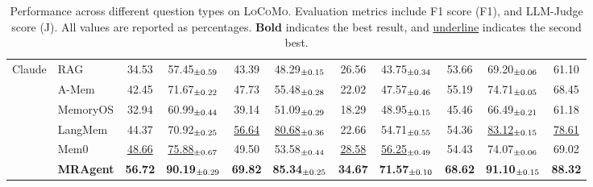 \documentclass{llmxive}
\begin{document}
\begin{table}[t]
\begin{tabular}{ll|cc|cc|cc|cc|c}
\midrule
\multirow{5}{*}{Claude}
& RAG
& 34.53 & 57.45$_{\scriptsize \pm 0.59}$
& 43.39 & 48.29$_{\scriptsize \pm 0.15}$
& 26.56 & 43.75$_{\scriptsize \pm 0.34}$
& 53.66 & 69.20$_{\scriptsize \pm 0.06}$
& 61.10 \\
& A-Mem
& 42.45 & 71.67$_{\scriptsize \pm 0.22}$
& 47.73 & 55.48$_{\scriptsize \pm 0.28}$
& 22.02 & 47.57$_{\scriptsize \pm 0.46}$
& 55.19 & 74.71$_{\scriptsize \pm 0.05}$
& 68.45 \\
& MemoryOS
& 32.94 & 60.99$_{\scriptsize \pm 0.44}$
& 39.14 & 51.09$_{\scriptsize \pm 0.29}$
& 18.29 & 48.95$_{\scriptsize \pm 0.15}$
& 45.46 & 66.49$_{\scriptsize \pm 0.21}$
& 61.18 \\
& LangMem
& 44.37 & 70.92$_{\scriptsize \pm 0.25}$
& \underline{56.64} & \underline{80.68$_{\scriptsize \pm 0.36}$}
& 22.66 & 54.71$_{\scriptsize \pm 0.55}$
& 54.36 & \underline{83.12$_{\scriptsize \pm 0.15}$}
& \underline{78.61} \\
& Mem0
& \underline{48.66} & \underline{75.88$_{\scriptsize \pm 0.67}$}
& 49.50 & 53.58$_{\scriptsize \pm 0.44}$
& \underline{28.58} & \underline{56.25$_{\scriptsize \pm 0.49}$}
& 54.43 & 74.07$_{\scriptsize \pm 0.06}$
& 69.02 \\
& \textbf{MRAgent}
& \textbf{56.72} & \textbf{90.19$_{\scriptsize \pm 0.29}$}
& \textbf{69.82} & \textbf{85.34$_{\scriptsize \pm 0.25}$}
& \textbf{34.67} & \textbf{71.57$_{\scriptsize \pm 0.10}$}
& \textbf{68.62} & \textbf{91.10$_{\scriptsize \pm 0.15}$}
& \textbf{88.32} \\

\bottomrule
\end{tabular}
\label{tab:reasoning_results}
\caption{Performance across different question types on \textsc{LoCoMo}. Evaluation metrics include F1 score (F1), and LLM-Judge score (J).
All values are reported as percentages. \textbf{Bold} indicates the best result, and \underline{underline} indicates the second best.}
\end{table}


\end{document}
